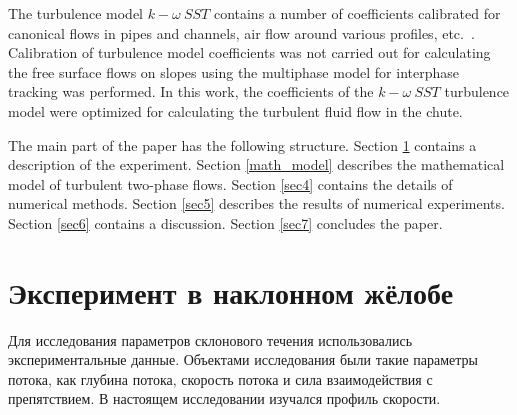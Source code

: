 \documentclass[mathematics,article,accept,pdftex,moreauthors]{Definitions/mdpi}
\begin{document}
The turbulence model $k-\omega\ SST$ contains a number of coefficients calibrated for canonical flows in pipes and channels, air flow around various profiles, etc.~\cite{LaunderSpalding1974, Tahry1983, LaunderMorseRodiSpaldiug1972}. Calibration of turbulence model coefficients was not carried out for calculating the free surface flows on slopes using the multiphase model for interphase tracking was performed. In this work, the coefficients of the $k-\omega\ SST$ turbulence model were optimized for calculating the turbulent fluid flow in the chute.

The main part of the paper has the following structure. 
Section \ref{sec2} contains a description of the experiment. Section \ref{math_model} describes the mathematical model of turbulent two-phase flows. Section \ref{sec4} contains the details of numerical methods. 
Section \ref{sec5} describes the results of numerical experiments. 
Section \ref{sec6} contains a discussion.
Section \ref{sec7} concludes the paper.


\section{Эксперимент в наклонном жёлобе }\label{sec2}

Для исследования параметров склонового течения использовались экспериментальные данные. Объектами исследования были такие параметры потока, как глубина потока, скорость потока и сила взаимодействия с препятствием. В настоящем исследовании изучался профиль скорости.
\end{document}
